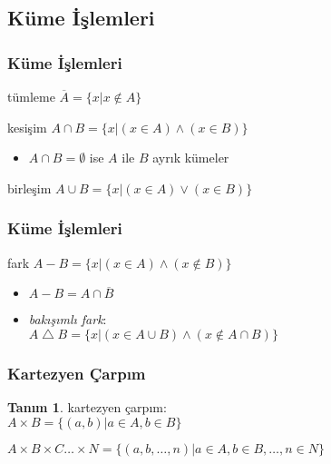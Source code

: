 \documentclass[dvipsnames]{beamer}
\theoremstyle{definition}
\newtheorem{tanim}[theorem]{Tanım}
\theoremstyle{example}
\theoremstyle{plain}
\begin{document}
\subsection{Küme İşlemleri}

\begin{frame}
  \frametitle{Küme İşlemleri}

  \begin{block}{tümleme}
    $\overline{A} = \{ x | x \notin A \} $
  \end{block}

  \pause
  \begin{block}{kesişim}
    $A \cap B = \{ x | (x \in A) \wedge (x \in B) \}$

    \pause
    \begin{itemize}
      \item $A \cap B = \emptyset$ ise $A$ ile $B$ \alert{ayrık kümeler}
    \end{itemize}
  \end{block}

  \pause
  \begin{block}{birleşim}
    $A \cup B = \{ x | (x \in A) \vee (x \in B) \}$
  \end{block}
\end{frame}

\begin{frame}
  \frametitle{Küme İşlemleri}

  \begin{block}{fark}
    $A - B = \{ x | (x \in A) \wedge (x \notin B) \}$

    \pause
    \begin{itemize}
      \item $A-B = A \cap \overline{B}$

      \pause
      \item \emph{bakışımlı fark}:\\
        $A \bigtriangleup B = \{ x | (x \in A \cup B)
                              \wedge (x \notin A \cap B) \}$
    \end{itemize}
  \end{block}
\end{frame}

\begin{frame}
  \frametitle{Kartezyen Çarpım}

  \begin{tanim}
    \alert{kartezyen çarpım}:\\
      $A \times B = \{ (a,b) | a \in A, b \in B \}$

      \pause
      \medskip
      $A \times B \times C \dots \times N =
        \{ (a,b,\dots,n) | a \in A, b \in B, \dots, n \in N \}$
  \end{tanim}
\end{frame}
\end{document}
